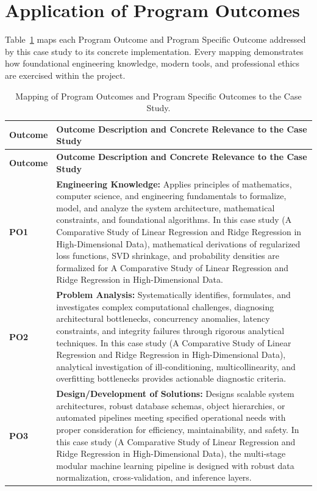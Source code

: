 \section{Application of Program Outcomes}
Table~\ref{tab:po} maps each Program Outcome and Program Specific Outcome addressed by this case study to its concrete implementation. Every mapping demonstrates how foundational engineering knowledge, modern tools, and professional ethics are exercised within the project.

{\small
\begin{longtable}{@{}>{\centering\arraybackslash}p{1.8cm} p{13.2cm}@{}}
    \caption{Mapping of Program Outcomes and Program Specific Outcomes to the Case Study.}\label{tab:po}\\
    \toprule
    \textbf{Outcome} & \textbf{Outcome Description and Concrete Relevance to the Case Study} \\
    \midrule
    \endfirsthead
    \toprule
    \textbf{Outcome} & \textbf{Outcome Description and Concrete Relevance to the Case Study} \\
    \midrule
    \endhead
\textbf{PO1} & \textbf{Engineering Knowledge:} Applies principles of mathematics, computer science, and engineering fundamentals to formalize, model, and analyze the system architecture, mathematical constraints, and foundational algorithms. In this case study (A Comparative Study of Linear Regression and Ridge Regression in High-Dimensional Data), mathematical derivations of regularized loss functions, SVD shrinkage, and probability densities are formalized for A Comparative Study of Linear Regression and Ridge Regression in High-Dimensional Data. \\
    \addlinespace
\textbf{PO2} & \textbf{Problem Analysis:} Systematically identifies, formulates, and investigates complex computational challenges, diagnosing architectural bottlenecks, concurrency anomalies, latency constraints, and integrity failures through rigorous analytical techniques. In this case study (A Comparative Study of Linear Regression and Ridge Regression in High-Dimensional Data), analytical investigation of ill-conditioning, multicollinearity, and overfitting bottlenecks provides actionable diagnostic criteria. \\
    \addlinespace
\textbf{PO3} & \textbf{Design/Development of Solutions:} Designs scalable system architectures, robust database schemas, object hierarchies, or automated pipelines meeting specified operational needs with proper consideration for efficiency, maintainability, and safety. In this case study (A Comparative Study of Linear Regression and Ridge Regression in High-Dimensional Data), the multi-stage modular machine learning pipeline is designed with robust data normalization, cross-validation, and inference layers. \\

\end{longtable}}
